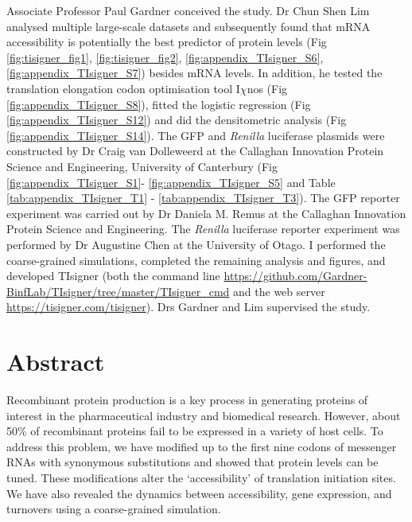 Associate Professor Paul Gardner conceived the study. Dr Chun Shen Lim analysed multiple large-scale datasets and subsequently found that mRNA accessibility is potentially the best predictor of protein levels (Fig \ref{fig:tisigner_fig1}, \ref{fig:tisigner_fig2}, \ref{fig:appendix_TIsigner_S6}, \ref{fig:appendix_TIsigner_S7}) besides mRNA levels. In addition, he tested the translation elongation codon optimisation tool I$\chi$nos (Fig \ref{fig:appendix_TIsigner_S8}), fitted the logistic regression  (Fig \ref{fig:appendix_TIsigner_S12}) and did the densitometric analysis (Fig \ref{fig:appendix_TIsigner_S14}). The GFP and \textit{Renilla} luciferase plasmids were constructed by Dr Craig van Dolleweerd at the Callaghan Innovation Protein Science and Engineering, University of Canterbury (Fig \ref{fig:appendix_TIsigner_S1}- \ref{fig:appendix_TIsigner_S5} and Table \ref{tab:appendix_TIsigner_T1} - \ref{tab:appendix_TIsigner_T3}). The GFP reporter experiment was carried out by Dr Daniela M. Remus at the Callaghan Innovation Protein Science and Engineering. The \textit{Renilla} luciferase reporter experiment was performed by Dr Augustine Chen at the University of Otago. I performed the coarse-grained simulations, completed the remaining analysis and figures, and developed TIsigner (both the command line \href{https://github.com/Gardner-BinfLab/TIsigner/tree/master/TIsigner\_cmd}{https://github.com/Gardner-BinfLab/TIsigner/tree/master/TIsigner\_cmd} and the web server \href{https://tisigner.com/tisigner}{https://tisigner.com/tisigner}). Drs Gardner and Lim supervised the study.

\section{Abstract}
Recombinant protein production is a key process in generating proteins of interest in the pharmaceutical industry and biomedical research. However, about 50\% of recombinant proteins fail to be expressed in a variety of host cells. To address this problem, we have modified up to the first nine codons of messenger RNAs with synonymous substitutions and showed that protein levels can be tuned. These modifications alter the ‘accessibility’ of translation initiation sites. We have also revealed the dynamics between accessibility, gene expression, and turnovers using a coarse-grained simulation.

